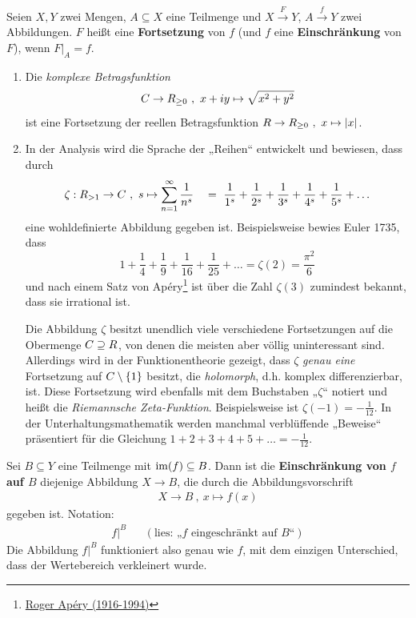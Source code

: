  
\begin{defin} \label{def:fortsetzung}  
    Seien $X,Y$ zwei Mengen, $A\subseteq X$ eine Teilmenge und $X\xrightarrow{F} Y$, $A\xrightarrow{f} Y$ zwei Abbildungen. $F$ heißt eine \textbf{Fortsetzung} von $f$ (und $f$ eine \textbf{Einschränkung} von $F$), wenn $F\vert_A=f$.
\end{defin}


\begin{bsp}[*] \quad
    \begin{enumerate}
        \item Die \emph{komplexe Betragsfunktion}
            \[ \relax C \to \relax R_{\ge 0} \ ,\ x+iy \mapsto \sqrt{x^2+y^2} \]
        ist eine Fortsetzung der reellen Betragsfunktion $\relax R\to \relax R_{\ge 0} \ ,\ x\mapsto \vert x\vert$.
        \item In der Analysis wird die Sprache der „Reihen“ entwickelt und bewiesen, dass durch
            \[ \zeta : \relax R_{>1} \to \relax C \ ,\ s \mapsto \sum_{n=1}^\infty \frac{1}{n^s} \quad =\  \frac{1}{1^s} + \frac{1}{2^s} + \frac{1}{3^s} + \frac{1}{4^s} + \frac{1}{5^s} + \ldots\]
        eine wohldefinierte Abbildung gegeben ist. Beispielsweise bewies Euler 1735, dass
            \[ 1 + \frac{1}{4} + \frac{1}{9} + \frac{1}{16} + \frac{1}{25} + \ldots = \zeta(2) = \frac{\pi^2}{6} \]
        und nach einem Satz von Apéry\footnote{\href{https://de.wikipedia.org/wiki/Roger Apery}{Roger Apéry (1916-1994)}} ist über die Zahl $\zeta(3)$ zumindest bekannt, dass sie irrational ist.

        Die Abbildung $\zeta$ besitzt unendlich viele verschiedene Fortsetzungen auf die Obermenge $\relax C \supseteq \relax R$, von denen die meisten aber völlig uninteressant sind. Allerdings wird in der Funktionentheorie gezeigt, dass $\zeta$ \emph{genau eine} Fortsetzung auf $\relax C\setminus \{1\}$ besitzt, die \emph{holomorph}, d.h. komplex differenzierbar, ist. Diese Fortsetzung wird ebenfalls mit dem Buchstaben „$\zeta$“ notiert und heißt die \emph{Riemannsche Zeta-Funktion}. Beispielsweise ist $\zeta(-1)=-\frac{1}{12}$. In der Unterhaltungsmathematik werden manchmal verblüffende „Beweise“ präsentiert für die Gleichung $1+2+3+4+5+\ldots = -\frac{1}{12}$.
    \end{enumerate}
\end{bsp}


\begin{defin} \label{def:zielschrank}
    Sei $B\subseteq Y$ eine Teilmenge mit $\operatorname{im}(f) \subseteq B$. Dann ist die \textbf{Einschränkung von $f$ auf $B$} diejenige Abbildung $X \to B$, die durch die Abbildungsvorschrift
    \begin{align*}
        X \to B \ ,\ x \mapsto f(x)
    \end{align*}
    gegeben ist. Notation:
    \begin{align*}
        f\vert^B && (\text{lies: „$f$ eingeschränkt auf $B$“})
    \end{align*}
    Die Abbildung $f\vert^B$ funktioniert also genau wie $f$, mit dem einzigen Unterschied, dass der Wertebereich verkleinert wurde.
\end{defin}


